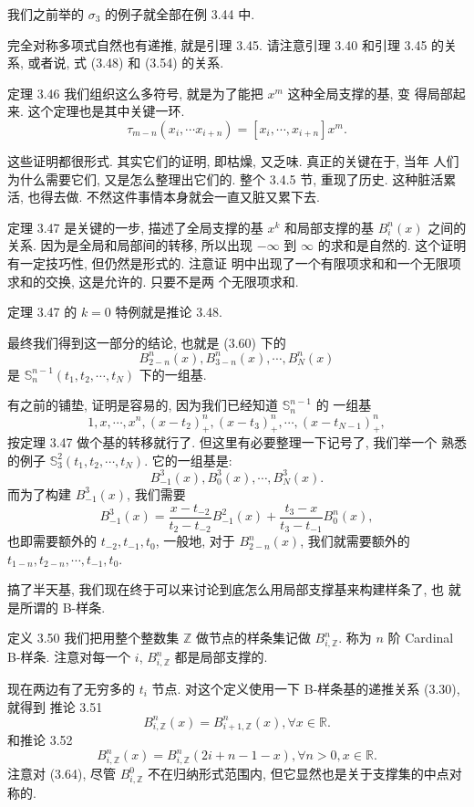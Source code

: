 \documentclass[a4paper]{ctexart}
\begin{document}
我们之前举的 $\sigma_3$ 的例子就全部在例 3.44 中.

完全对称多项式自然也有递推, 就是引理 3.45. 请注意引理 3.40 和引理 3.45 的关系, 或者说,
式 (3.48) 和 (3.54) 的关系.

定理 3.46 我们组织这么多符号, 就是为了能把 $x^m$ 这种全局支撑的基, 变
得局部起来. 这个定理也是其中关键一环.
$$
\tau_{m - n}(x_i, \cdots x_{i + n}) = [x_i, \cdots, x_{i + n}] x^m.
$$

这些证明都很形式. 其实它们的证明, 即枯燥, 又乏味. 真正的关键在于, 当年
人们为什么需要它们, 又是怎么整理出它们的. 整个 3.4.5 节, 重现了历史.
这种脏活累活, 也得去做. 不然这件事情本身就会一直又脏又累下去.

定理 3.47 是关键的一步, 描述了全局支撑的基 $x^k$ 和局部支撑的基
$B_i^n(x)$ 之间的关系. 因为是全局和局部间的转移, 所以出现 $-\infty$ 到
$\infty$ 的求和是自然的. 这个证明有一定技巧性, 但仍然是形式的. 注意证
明中出现了一个有限项求和和一个无限项求和的交换, 这是允许的. 只要不是两
个无限项求和.

定理 3.47 的 $k = 0$ 特例就是推论 3.48.

最终我们得到这一部分的结论, 也就是 (3.60) 下的
$$
B_{2 - n}^n(x), B_{3 - n}^n(x), \cdots, B_{N}^n(x)
$$
是 $\mathbb{S}_n^{n - 1}(t_1, t_2, \cdots, t_N)$ 下的一组基.

有之前的铺垫, 证明是容易的, 因为我们已经知道 $\mathbb{S}_n^{n - 1}$ 的
一组基
$$
1, x, \cdots, x^n, (x - t_2)_+^n, (x - t_3)_+^n, \cdots, (x - t_{N - 1})_+^n,
$$
按定理 3.47 做个基的转移就行了. 但这里有必要整理一下记号了, 我们举一个
熟悉的例子 $\mathbb{S}_3^2(t_1, t_2, \cdots, t_N)$. 它的一组基是:
$$
B_{-1}^3(x), B_{0}^3(x), \cdots, B_N^3(x).
$$
而为了构建 $B_{-1}^3(x)$, 我们需要
$$
B_{-1}^3(x) = \frac{x - t_{-2}}{t_2 - t_{-2}}B_{-1}^2(x) +
\frac{t_{3} - x}{t_3 - t_{-1}}B_{0}^n(x),
$$
也即需要额外的 $t_{-2}, t_{-1}, t_0$, 一般地, 对于 $B_{2 - n}^n(x)$,
我们就需要额外的$t_{1 - n}, t_{2 - n}, \cdots, t_{-1}, t_0$.

搞了半天基, 我们现在终于可以来讨论到底怎么用局部支撑基来构建样条了, 也
就是所谓的 B-样条.

定义 3.50 我们把用整个整数集 $\mathbb{Z}$ 做节点的样条集记做 $B_{i,
  \mathbb{Z}}^n$. 称为 $n$ 阶 Cardinal B-样条. 注意对每一个 $i$, $B_{i,
  \mathbb{Z}}^n$ 都是局部支撑的.

现在两边有了无穷多的 $t_i$ 节点. 对这个定义使用一下 B-样条基的递推关系 (3.30), 就得到
推论 3.51
$$
B_{i, \mathbb{Z}}^n(x) = B_{i + 1, \mathbb{Z}}^n(x), \forall x \in \mathbb{R}.
$$
和推论 3.52
$$
B_{i, \mathbb{Z}}^n(x) = B_{i, \mathbb{Z}}^n(2i + n - 1 - x), \forall n > 0, x \in \mathbb{R}.
$$
注意对 (3.64), 尽管 $B_{i, \mathbb{Z}}^0$ 不在归纳形式范围内, 但它显然也是关于支撑集的中点对称的.
\end{document}
